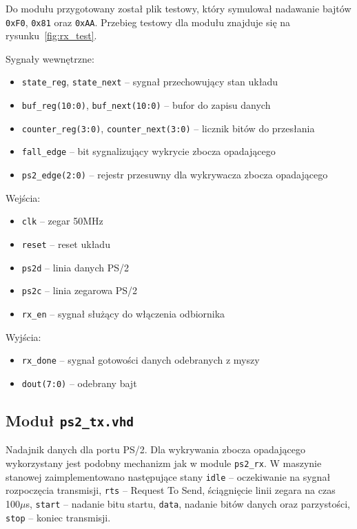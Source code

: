 Do modułu przygotowany został plik testowy, który symulował nadawanie bajtów
\texttt{0xF0}, \texttt{0x81} oraz \texttt{0xAA}.
Przebieg testowy dla modułu znajduje się na rysunku~\ref{fig:rx_test}.
\vspace{1em}

Sygnały wewnętrzne:
\begin{itemize}
  \item \texttt{state\_reg}, \texttt{state\_next} -- sygnał przechowujący stan
    układu
  \item \texttt{buf\_reg(10:0)}, \texttt{buf\_next(10:0)} -- bufor do zapisu
    danych
  \item \texttt{counter\_reg(3:0)}, \texttt{counter\_next(3:0)} -- licznik bitów
    do przesłania
  \item \texttt{fall\_edge} -- bit sygnalizujący wykrycie zbocza opadającego
  \item \texttt{ps2\_edge(2:0)} -- rejestr przesuwny dla wykrywacza zbocza
    opadającego
\end{itemize}
\vspace{1em}
Wejścia:
\begin{itemize}
  \item \texttt{clk} -- zegar 50MHz
  \item \texttt{reset} -- reset układu
  \item \texttt{ps2d} -- linia danych PS/2
  \item \texttt{ps2c} -- linia zegarowa PS/2
  \item \texttt{rx\_en} -- sygnał służący do włączenia odbiornika
\end{itemize}
\vspace{1em}
Wyjścia:
\begin{itemize}
  \item \texttt{rx\_done} -- sygnał gotowości danych odebranych z myszy
  \item \texttt{dout(7:0)} -- odebrany bajt
\end{itemize}

\subsection{Moduł \texttt{ps2\_tx.vhd}}
Nadajnik danych dla portu PS/2. Dla wykrywania zbocza opadającego wykorzystany
jest podobny mechanizm jak w module \texttt{ps2\_rx}. W maszynie stanowej
zaimplementowano następujące stany \texttt{idle} -- oczekiwanie na sygnał
rozpoczęcia transmisji, \texttt{rts} -- Request To Send, ściągnięcie linii
zegara na czas 100$\mu$s, \texttt{start} -- nadanie bitu startu, \texttt{data},
nadanie bitów danych oraz parzystości, \texttt{stop} -- koniec transmisji.
\vspace{1em}

